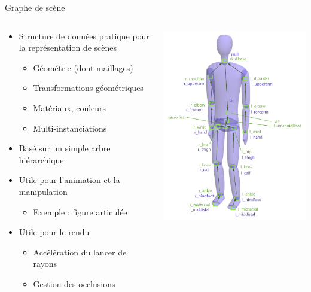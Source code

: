 \begin{frame}{Graphe de scène}
\begin{columns}
\begin{column}{.6\textwidth}
\begin{itemize}
\item Structure de données pratique pour la représentation de scènes
\begin{itemize}
\item Géométrie (dont maillages)
\item Transformations géométriques
\item Matériaux, couleurs
\item Multi-instanciations
\end{itemize}
\item Basé sur un simple arbre hiérarchique
\item Utile pour l'animation et la manipulation
\begin{itemize}
\item Exemple : figure articulée
\end{itemize}
\item Utile pour le rendu
\begin{itemize}
\item Accélération du lancer de rayons
\item Gestion des occlusions
\end{itemize}
\end{itemize}
\end{column}
\begin{column}{.39\textwidth}
\begin{center}
\includegraphics[width=.8\textwidth]{figs/hanim.jpg}
\end{center}
\end{column}
\end{columns}
\end{frame}

